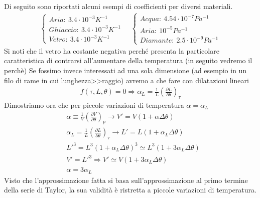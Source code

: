 \documentclass[10pt,a4paper]{article}
\begin{document}
Di seguito sono riportati alcuni esempi di coefficienti per diversi materiali. 
\begin{align*}
	\begin{cases}
		Aria:\ 3.4\cdot10^{-3} K^{-1}\\
		Ghiaccio:\ 3.4\cdot10^{-3} K^{-1}\\
		Vetro:\ 3.4\cdot10^{-3} K^{-1}
	\end{cases} \quad
	\begin{cases}
		Acqua:\ 4.54\cdot 10^{-7} Pa^{-1}\\
		Aria:\ 10^{-5} Pa^{-1}\\
		Diamante:\ 2.5 \cdot 10^{-9} Pa^{-1}
	\end{cases}
\end{align*}
Si noti che il vetro ha costante negativa perché presenta la particolare caratteristica di contrarsi all'aumentare della temperatura (in seguito vedremo il perchè)
Se fossimo invece interessati ad una sola dimensione (ad esempio in un filo di rame in cui lunghezza>>raggio) avremo a che fare con dilatazioni lineari
\begin{align*}
	f(\tau, L, \theta) = 0 \Rightarrow \alpha_L = \frac{1}{L}(\frac{\partial L}{\partial \theta})_{\tau}
\end{align*}
Dimostriamo ora che per piccole variazioni di temperatura $\alpha = \alpha_L$
\begin{align*}
	&\alpha \equiv \frac{1}{V} (\frac{\partial V}{\partial \theta})_p \rightarrow V' = V(1 + \alpha \Delta \theta)\\
	&\alpha_L = \frac{1}{L}(\frac{\partial L}{\partial \theta})_{\tau} \rightarrow L' = L(1 + \alpha_L \Delta \theta)\\
	&L'^{3} = L^3 (1 + \alpha_L \Delta \theta)^3 \simeq L^3 (1+3\alpha_L \Delta \theta)\\
	&V' = L'^3 \Rightarrow V' \simeq V (1 + 3 \alpha_L \Delta \theta)\\
	&\alpha = 3\alpha_L
\end{align*}
Visto che l'approssimazione fatta si basa sull'approssimazione al primo termine della serie di Taylor, la sua validità è ristretta a piccole variazioni di temperatura.\\
\end{document}
